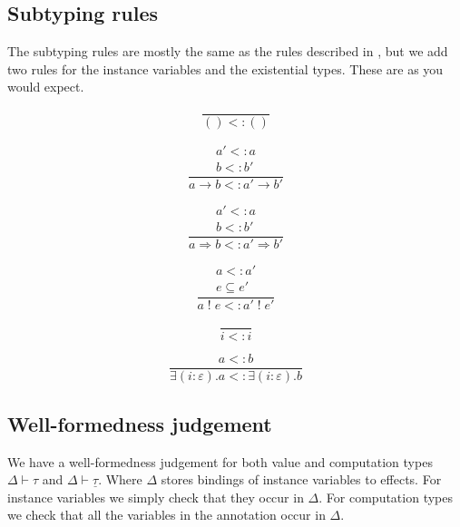 \documentclass[12pt]{article}
\newcommand\eff[0]{\varepsilon}
\newcommand\ty[0]{\tau}
\newcommand\tunit[0]{()}
\newcommand\tarr[2]{#1 \rightarrow #2}
\newcommand\thandler[2]{#1 \Rightarrow #2}
\newcommand\cty[0]{\underline{\ty}}
\newcommand\aty[2]{#1 \; ! \; #2}
\newcommand\texists[3]{\exists(#1:#2) . #3}
\newcommand\subty[2]{#1 <: #2}
\begin{document}
\newpage
\subsection{Subtyping rules}

The subtyping rules are mostly the same as the rules described in \cite{effectsystem}, but we add two rules for the instance variables and the existential types.
These are as you would expect.

\begin{minipage}{0.5\textwidth}
\[\frac{
}{
	\subty{\tunit}{\tunit}
}\]
\vspace{10pt}
\end{minipage}
\begin{minipage}{0.5\textwidth}
\[\frac{
	\begin{array}{l}
	\subty{a'}{a} \\
	\subty{b}{b'}
	\end{array}
}{
	\subty{\tarr{a}{b}}{\tarr{a'}{b'}}
}\]
\vspace{10pt}
\end{minipage}
\begin{minipage}{0.5\textwidth}
\[\frac{
	\begin{array}{l}
	\subty{a'}{a} \\
	\subty{b}{b'}
	\end{array}
}{
	\subty{\thandler{a}{b}}{\thandler{a'}{b'}}
}\]\vspace{10pt}
\end{minipage}
\begin{minipage}{0.5\textwidth}
\[\frac{
	\begin{array}{l}
	\subty{a}{a'} \\
	e \subseteq e'
	\end{array}
}{
	\subty{\aty{a}{e}}{\aty{a'}{e'}}
}\]\vspace{10pt}
\end{minipage}

\begin{minipage}{0.5\textwidth}
\[\frac{
}{
	\subty{i}{i}
}\]
\end{minipage}
\begin{minipage}{0.5\textwidth}
\[\frac{
	\subty{a}{b}
}{
	\subty{\texists{i}{\eff}{a}}{\texists{i}{\eff}{b}}
}\]
\end{minipage}

\subsection{Well-formedness judgement}
We have a well-formedness judgement for both value and computation types $\Delta \vdash \ty$ and $\Delta \vdash \cty$.
Where $\Delta$ stores bindings of instance variables to effects.
For instance variables we simply check that they occur in $\Delta$.
For computation types we check that all the variables in the annotation occur in $\Delta$.
\\
\end{document}
